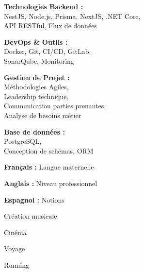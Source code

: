 \documentclass[a4paper,11pt]{article}
\begin{document}
\begin{cv}[profile][2]
    \cvseparator[2]
    \begin{cvitem}
        \textbf{Technologies Backend :} \\
        NestJS, Node.js, Prisma, NextJS, .NET Core, \\
        API RESTful, Flux de données
    \end{cvitem}

    \cvseparator[2]
    \begin{cvitem}
        \textbf{DevOps \& Outils :} \\
        Docker, Git, CI/CD, GitLab, \\
        SonarQube, Monitoring
    \end{cvitem}

    \cvseparator[2]
    \begin{cvitem}
        \textbf{Gestion de Projet :} \\
        Méthodologies Agiles, \\
        Leadership technique, \\
        Communication parties prenantes, \\
        Analyse de besoins métier
    \end{cvitem}

    \cvseparator[2]
    \begin{cvitem}
        \textbf{Base de données :} \\
        PostgreSQL, \\
        Conception de schémas, ORM
    \end{cvitem}

\begin{cvitem}
    \textbf{Français :} Langue maternelle
\end{cvitem}

\cvseparator
\begin{cvitem}
    \textbf{Anglais :} Niveau professionnel
\end{cvitem}

\cvseparator
\begin{cvitem}
    \textbf{Espagnol :} Notions
\end{cvitem}

\begin{cvitem}
    Création musicale
\end{cvitem}

\cvseparator
\begin{cvitem}
    Cinéma
\end{cvitem}

\cvseparator
\begin{cvitem}
    Voyage
\end{cvitem}

\cvseparator
\begin{cvitem}
    Running
\end{cvitem}

\end{cv}
\end{document}
